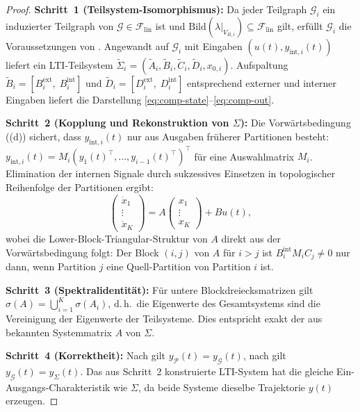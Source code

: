 ﻿\documentclass[12pt,a4paper]{article}
\theoremstyle{definition}
\begin{document}
\begin{proof}
\textbf{Schritt~1 (Teilsystem-Isomorphismus):}
Da jeder Teilgraph $\mathcal{G}_i$ ein induzierter Teilgraph von
$\mathcal{G} \in \mathcal{F}_{\mathrm{lin}}$ ist und
$\mathrm{Bild}(\lambda|_{V_{B,i}}) \subseteq \mathcal{F}_{\mathrm{lin}}$
gilt, erfüllt $\mathcal{G}_i$ die Voraussetzungen von .
Angewandt auf $\mathcal{G}_i$ mit Eingaben
$(u(t), y_{\mathrm{int},i}(t))$ liefert  ein
LTI-Teilsystem $\tilde{\Sigma}_i = (\tilde{A}_i, \tilde{B}_i,
\tilde{C}_i, \tilde{D}_i, x_{0,i})$.
Aufspaltung
$\tilde{B}_i = [B_i^{\mathrm{ext}},\; B_i^{\mathrm{int}}]$
und
$\tilde{D}_i = [D_i^{\mathrm{ext}},\; D_i^{\mathrm{int}}]$
entsprechend externer und interner Eingaben liefert die Darstellung
\eqref{eq:comp-state}--\eqref{eq:comp-out}.

\textbf{Schritt~2 (Kopplung und Rekonstruktion von $\Sigma$):}
Die Vorwärtsbedingung ((d)) sichert, dass
$y_{\mathrm{int},i}(t)$ nur aus Ausgaben früherer Partitionen
besteht: $y_{\mathrm{int},i}(t) = M_i (y_1(t)^\top, \ldots,
y_{i-1}(t)^\top)^\top$ für eine Auswahlmatrix $M_i$.
Elimination der internen Signale durch sukzessives Einsetzen in
topologischer Reihenfolge der Partitionen ergibt:
\[
  \begin{pmatrix} \dot{x}_1 \\ \vdots \\ \dot{x}_K \end{pmatrix}
  = A
  \begin{pmatrix} x_1 \\ \vdots \\ x_K \end{pmatrix}
  + B u(t),
\]
wobei die Lower-Block-Triangular-Struktur von $A$ direkt aus der
Vorwärtsbedingung folgt: Der Block $(i,j)$ von $A$ für $i > j$ ist
$B_i^{\mathrm{int}} M_i C_j \neq 0$ nur dann, wenn Partition $j$ eine
Quell-Partition von Partition $i$ ist.

\textbf{Schritt~3 (Spektralidentität):}
Für untere Blockdreiecksmatrizen gilt
$\sigma(A) = \bigcup_{i=1}^K \sigma(A_i)$,
d.\,h.\ die Eigenwerte des Gesamtsystems sind die Vereinigung der
Eigenwerte der Teilsysteme. Dies entspricht exakt der aus 
bekannten Systemmatrix $A$ von $\Sigma$.

\textbf{Schritt~4 (Korrektheit):}
Nach  gilt $y_{\mathcal{P}}(t) = y_{\mathcal{G}}(t)$,
nach  gilt $y_{\mathcal{G}}(t) = y_{\Sigma}(t)$.
Das aus Schritt~2 konstruierte LTI-System hat die gleiche Ein-Ausgangs-Charakteristik
wie $\Sigma$, da beide Systeme dieselbe Trajektorie $y(t)$ erzeugen.
\end{proof}
\end{document}
